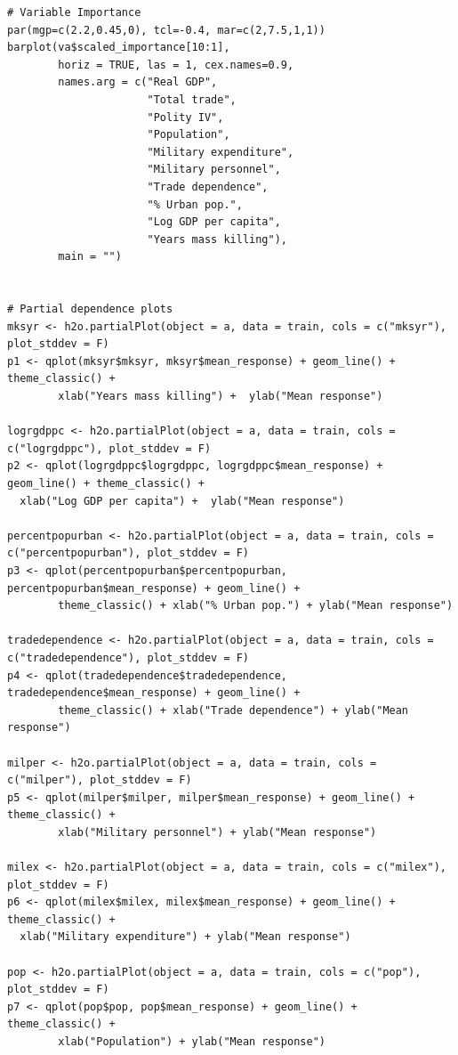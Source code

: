 \documentclass[a4paper,12pt]{article}
\begin{document}
\begin{verbatim}
# Variable Importance
par(mgp=c(2.2,0.45,0), tcl=-0.4, mar=c(2,7.5,1,1))
barplot(va$scaled_importance[10:1],
        horiz = TRUE, las = 1, cex.names=0.9,
        names.arg = c("Real GDP",
                      "Total trade",
                      "Polity IV",
                      "Population", 
                      "Military expenditure",
                      "Military personnel",
                      "Trade dependence", 
                      "% Urban pop.",
                      "Log GDP per capita",
                      "Years mass killing"),
        main = "")


# Partial dependence plots
mksyr <- h2o.partialPlot(object = a, data = train, cols = c("mksyr"), plot_stddev = F)
p1 <- qplot(mksyr$mksyr, mksyr$mean_response) + geom_line() + theme_classic() +
        xlab("Years mass killing") +  ylab("Mean response")

logrgdppc <- h2o.partialPlot(object = a, data = train, cols = c("logrgdppc"), plot_stddev = F)
p2 <- qplot(logrgdppc$logrgdppc, logrgdppc$mean_response) + geom_line() + theme_classic() +
  xlab("Log GDP per capita") +  ylab("Mean response")

percentpopurban <- h2o.partialPlot(object = a, data = train, cols = c("percentpopurban"), plot_stddev = F)
p3 <- qplot(percentpopurban$percentpopurban, percentpopurban$mean_response) + geom_line() +
        theme_classic() + xlab("% Urban pop.") + ylab("Mean response")

tradedependence <- h2o.partialPlot(object = a, data = train, cols = c("tradedependence"), plot_stddev = F)
p4 <- qplot(tradedependence$tradedependence, tradedependence$mean_response) + geom_line() +
        theme_classic() + xlab("Trade dependence") + ylab("Mean response")

milper <- h2o.partialPlot(object = a, data = train, cols = c("milper"), plot_stddev = F)
p5 <- qplot(milper$milper, milper$mean_response) + geom_line() + theme_classic() +
        xlab("Military personnel") + ylab("Mean response")

milex <- h2o.partialPlot(object = a, data = train, cols = c("milex"), plot_stddev = F)
p6 <- qplot(milex$milex, milex$mean_response) + geom_line() + theme_classic() +
  xlab("Military expenditure") + ylab("Mean response")

pop <- h2o.partialPlot(object = a, data = train, cols = c("pop"), plot_stddev = F)
p7 <- qplot(pop$pop, pop$mean_response) + geom_line() + theme_classic() +
        xlab("Population") + ylab("Mean response")


\end{verbatim}
\end{document}
